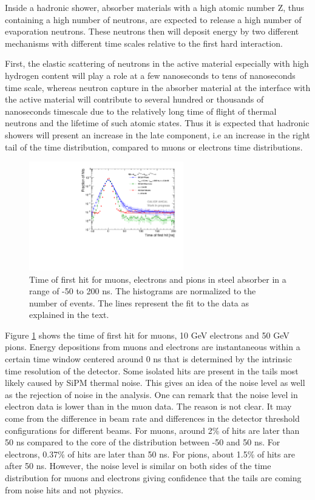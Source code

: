 Inside a hadronic shower, absorber materials with a high atomic number Z, thus containing a high number of neutrons, are expected to release a high number of evaporation neutrons. These neutrons then will deposit energy by two different mechanisms with different time scales relative to the first hard interaction.

First, the elastic scattering of neutrons in the active material especially with high hydrogen content will play a role at a few nanoseconds to tens of nanoseconds time scale, whereas neutron capture in the absorber material at the interface with the active material will contribute to several hundred or thousands of nanoseconds timescale due to the relatively long time of flight of thermal neutrons and the lifetime of such atomic states. Thus it is expected that hadronic showers will present an increase in the late component, i.e an increase in the right tail of the time distribution, compared to muons or electrons time distributions.

\begin{figure}[htbp!]
	\centering
	\includegraphics[width=0.6\textwidth]{../Thesis_Plots/Timing/Pions/Plots/Timing_dNdt_Comparison.pdf}
	\caption{Time of first hit for muons, electrons and pions in steel absorber in a range of -50 to 200 ns. The histograms are normalized to the number of events. The lines represent the fit to the data as explained in the text.}
	\label{fig:dNdt_Comparison}
\end{figure}

Figure \ref{fig:dNdt_Comparison} shows the time of first hit for muons, 10 GeV electrons and 50 GeV pions. Energy depositions from muons and electrons are instantaneous within a certain time window centered around 0 ns that is determined by the intrinsic time resolution of the detector. Some isolated hits are present in the tails most likely caused by SiPM thermal noise. This gives an idea of the noise level as well as the rejection of noise in the analysis. One can remark that the noise level in electron data is lower than in the muon data. The reason is not clear. It may come from the difference in beam rate and differences in the detector threshold configurations for different beams. For muons, around 2\% of hits are later than 50 ns compared to the core of the distribution between -50 and 50 ns. For electrons, 0.37\% of hits are later than 50 ns. For pions, about 1.5\% of hits are after 50 ns. However, the noise level is similar on both sides of the time distribution for muons and electrons giving confidence that the tails are coming from noise hits and not physics.

